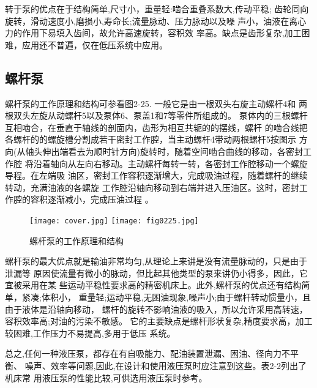 转于泵的优点在于结构简单,尺寸小，重量轻:啮合重叠系数大,传动平稳;
齿轮同向旋转，滑动速度小,磨损小,寿命长;流量脉动、压力脉动以及噪
声小，油液在离心力的作用下易填入齿间，故允许高速旋转，容积效
率高。缺点是齿形复杂,加工困难，应用还不普遍，仅在低压系统中应用。
\subsection*{螺杆泵}
螺杆泵的工作原理和结构可参看图2-25. 一般它是由一根双头右旋主动螺杆4和
两根双头左旋从动螺杆5以及泵体6、泵盖1和7等零件所组成的。
泵体内的三根螺杆互相啮合，在垂直于轴线的剖面内，齿形为相互共轭的的摆线，螺杆
的啮合线把各螺杆的的螺旋槽分割成若干密封工作腔，当主动螺杆4带动两根螺杆5按图示
方向(从轴头伸出端看去为顺时针方向)旋转时，随着空间啮合曲线的移动，各密封工作腔
将沿着轴向从左向右移动。主动螺杆每转一转，各密封工作腔移动一个螺旋导程。在左端吸
油区，密封工作容积逐渐增大，完成吸油过程，随着螺杆的继续转动，充满油液的各螺旋
工作腔沿轴向移动到右端并进入压油区。这时，密封工作腔的容积逐渐减小，完成压油过程
。
\begin{figure} [htbp]
    \centering
    \ifOpenSource
    \texttt{[image: cover.jpg]}
    \else
    \texttt{[image: fig0225.jpg]}
    \fi
    \caption{螺杆泵的工作原理和结构} 
    \label{fig:fig0225}
\end{figure}

螺杆泵的最大优点就是输油非常均匀,从理论上来讲是没有流量脉动的，只是由于泄漏等
原因使流量有微小的脉动，但比起其他类型的泵来讲仍小得多，因此，它宜被采用在某
些运动平稳性要求高的精密机床上。此外,螺杆泵的优点还有结构简单，紧凑;体积小，
重量轻;运动平稳,无困油现象,噪声小;由于螺杆转动惯量小，且由于液体是沿轴向移动，
螺杆的旋转不影响油液的吸入，所以允许采用高转速，容积效率高;对油的污染不敏感。
它的主要缺点是螺杆形状复杂,精度要求高，加工较困难,工作压力不易提高,多用于低压
系统。

总之,任何一种液压泵，都存在有自吸能力、配油装置泄漏、困油、径向力不平衡、
噪声、效率等问题,因此,在设计和使用液压泵时应注意到这些。表2-2列出了机床常
用液压泵的性能比较,可供选用液压泵时参考。